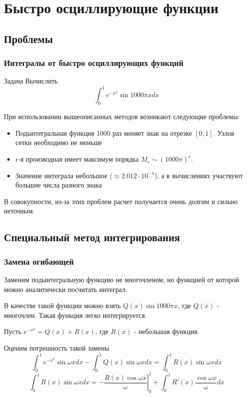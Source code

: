 \documentclass[apectratio=43,unicode]{beamer}
\begin{document}
\section{Быстро осциллирующие функции}
\subsection{Проблемы}
\begin{frame}
\frametitle{Интегралы от быстро осциллирующих функций}
	\begin{block}{Задача}
		Вычислить
		\[
		\int_0^1 e^{-x^2} \sin 1000\pi x dx
		\]
	\end{block}
	\pause

	При использовании вышеописанных методов возникают следующие проблемы:
	\begin{itemize}
		\item Подынтегральная функция 1000 раз меняет знак на отрезке $[0,1]$. Узлов сетки необходимо не меньше
		\item r-я производная имеет максимум порядка $M_r \sim (1000\pi)^r$.
		\item Значение интеграла небольшое ($\approx 2.012\cdot10^{-4}$), а в вычислениях участвуют большие числа разного знака
	\end{itemize}

	В совокупности, из-за этих проблем расчет получается очень долгим и сильно неточным.
\end{frame}

\subsection{Специальный метод интегрирования}
\begin{frame}
\frametitle{Замена огибающей}
	Заменим подынтегральную функцию не многочленом, но функцией от которой можно аналитически посчитать
	интеграл.
	\pause

	В качестве такой функции можно взять $Q(x) \sin 1000\pi x$, где $Q(x)$ - многочлен.
	Такая функция легко интегрируется.
	\pause

	Пусть $e^{-x^2} = Q(x) + R(x)$, где $R(x)$ - небольшая функция.

	Оценим погрешность такой замены
	$$
	\int_0^1 e^{-x^2} \sin \omega x dx - \int_0^1 Q(x) \sin \omega x dx =
	\int_0^1 R(x) \sin \omega x dx
	$$
	$$
	\int_0^1 R(x) \sin \omega x dx = - \left.\frac{R(x) \cos \omega x}{\omega} \right|_0^1 +
	\int_0^1 R'(x) \frac{\cos \omega x}{\omega} dx
	$$
\end{frame}
\end{document}
